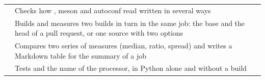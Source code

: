 \documentclass[12pt,a4paper,twoside,openright]{book}
\begin{document}
\begin{longtable}{L{5cm}L{8.8cm}}
   & Checks how , meson and
    autoconf read  written in several ways\\
   & Builds and measures two builds in turn
    in the same job: the base and the head of a pull request, or one source
    with two options\\
   & Compares two series of measures
    (median, ratio, spread) and writes a Markdown table for the summary of
    a job\\
   & Tests
     and the name of the processor, in Python
    alone and without a build\\
\end{longtable}
\endgroup
\end{document}
